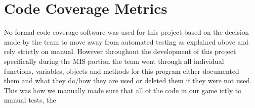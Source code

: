 \documentclass[12pt, titlepage]{article}
\begin{document}
\section{Code Coverage Metrics}
No formal code coverage software was used for this project based on the decision made by the team to move away from automated testing as explained above and rely strictly on manual. However throughout the development of this project specifically during the MIS portion the team went through all individual functions, variables, objects and methods for this program either documented them and what they do/how they are used or deleted them if they were not used. This was how we manually made sure that all of the code in our game ictly to manual tests, the





\end{document}
